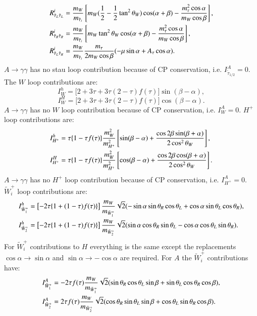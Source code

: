 \documentclass[final,3p,times]{elsarticle}
\begin{document}
\begin{align}
R_{\tilde{\tau}_L \tilde{\tau}_L}^i &= {m_W \over m_{\tilde{\tau}_i}}\left[m_W({1 \over 2} - {1 \over 2}\tan^2 \theta_W)\cos(\alpha+\beta) - {m_{\tau}^2 \cos \alpha \over m_W \cos\beta}\right], \\
R_{\tilde{\tau}_R \tilde{\tau}_R}^i &= {m_W \over m_{\tilde{\tau}_i}}\left[m_W \tan^2 \theta_W\cos(\alpha+\beta) - {m_{\tau}^2 \cos \alpha \over m_W \cos\beta}\right], \\
R_{\tilde{\tau}_L \tilde{\tau}_R}^i &= {m_W \over m_{\tilde{\tau}_i}}{m_\tau \over 2m_W \cos\beta}(-\mu \sin \alpha + A_\tau \cos\alpha).
\end{align}
$A \rightarrow \gamma \gamma$ has no stau loop contribution because of CP conservation, i.e. $I_{\tilde{\tau}_{1/2}}^A = 0$.
The $W$ loop contributions are:
\begin{equation}
I_{W}^h = \Big[2+3\tau +3\tau(2-\tau)f(\tau)\Big]\sin(\beta-\alpha),
\end{equation}
\begin{equation}
I_{W}^H = \Big[2+3\tau +3\tau(2-\tau)f(\tau)\Big]\cos(\beta-\alpha).
\end{equation}
$A \rightarrow \gamma \gamma$ has no $W$ loop contribution because of CP conservation, i.e. $I_{W}^A = 0$.
$H^+$ loop contributions are:
\begin{align}
I_{H^+}^h &= \tau\{1-\tau f(\tau)\}{m_{W}^2 \over m_{H^+}^2}\left[\sin(\beta - \alpha) + {\cos 2\beta \sin(\beta+\alpha) \over 2 \cos^2 \theta_W}\right], \\
I_{H^+}^H &= \tau\{1-\tau f(\tau)\}{m_{W}^2 \over m_{H^+}^2}\left[\cos(\beta - \alpha) + {\cos 2\beta \cos(\beta+\alpha) \over 2 \cos^2 \theta_W}\right].
\end{align}
$A \rightarrow \gamma \gamma$ has no $H^+$ loop contribution because of CP conservation, i.e. $I_{H^+}^A = 0$.
$\tilde{W}_{i}^+$ loop contributions are:
\begin{align}
I_{\tilde{W}_{1}^+}^h &= \left[-2\tau\{1+(1-\tau)f(\tau)\}\right]{m_{W} \over m_{\tilde{W}_{1}^+}}\sqrt{2}(-\sin\alpha \sin \theta_R \cos\theta_L + \cos\alpha \sin\theta_L \cos\theta_R), \\
I_{\tilde{W}_{2}^+}^h &= \left[-2\tau\{1+(1-\tau)f(\tau)\}\right]{m_{W} \over m_{\tilde{W}_{2}^+}}\sqrt{2}(\sin\alpha \cos \theta_R \sin\theta_L - \cos\alpha \cos\theta_L \sin\theta_R). 
\end{align}
For $\tilde{W}_{i}^+$ contributions to $H$ everything is the same except the replacements $\cos\alpha \rightarrow \sin\alpha$ and $\sin\alpha \rightarrow -\cos\alpha$ are required.
For $A$ the $\tilde{W}_{i}^+$ contributions have:
\begin{align}
I_{\tilde{W}_{1}^+}^A &= -2\tau f(\tau){m_W \over m_{\tilde{W}_{1}^+}}\sqrt{2}(\sin\theta_R \cos\theta_L \sin\beta + \sin\theta_L \cos\theta_R \cos\beta), \\
I_{\tilde{W}_{2}^+}^A &= 2\tau f(\tau){m_{W} \over m_{\tilde{W}_{2}^+}}\sqrt{2}(\cos\theta_R \sin\theta_L \sin\beta +\cos\theta_L \sin\theta_R \cos\beta).
\end{align}
\end{document}
